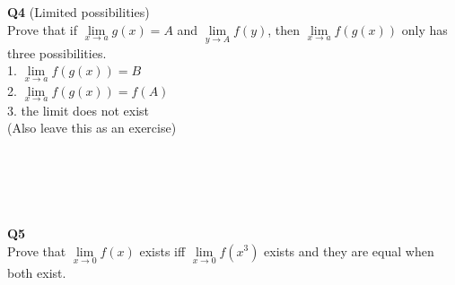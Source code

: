 \documentclass{article}
\newcommand{\tb}[1]{\textbf{#1}}
\begin{document}
\\
\\
\\
\\
\\
\\
\\
\\
\\
\\
\tb{Q4} (Limited possibilities)\\
Prove that if $\lim\limits_{x \to a}g(x) = A$ and $\lim\limits_{y \to A}f(y)$, then $\lim\limits_{x \to a}f(g(x))$ only has three possibilities.\\
1. $\lim\limits_{x \to a}f(g(x)) = B$\\
2. $\lim\limits_{x \to a}f(g(x)) = f(A)$\\
3. the limit does not exist\\
(Also leave this as an exercise)\\
\\
\\
\\
\\
\\
\tb{Q5}\\
Prove that $\lim\limits_{x \to 0} f(x)$ exists iff $\lim\limits_{x \to 0}f(x^3)$ exists and they are equal when both exist.\\
\newpage
\end{document}
